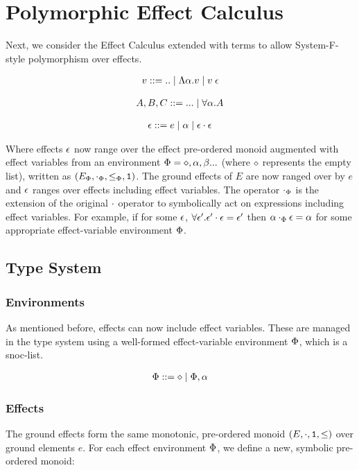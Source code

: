 \documentclass{Report}
\begin{document}
\section{Polymorphic Effect Calculus}

Next, we consider the Effect Calculus extended with terms to allow System-F-style polymorphism over effects.

\begin{align*}
    v::=\text{..}\mid\elam{\a}{v}\mid\eapp{v}{\e}
\end{align*}

\begin{align*}
    A, B, C::=\text{...}\mid \all{\a}{A}
\end{align*}

\begin{align*}
    \e ::= e \mid \a \mid \e\dot\e
\end{align*}

Where effects $\e$ now range over the effect pre-ordered monoid augmented with effect variables from an environment $\P = \nil, \a, \b ...$ (where $\nil$ represents the empty list), written as $(E_\P, \dotp, \subeffectp, \1)$. The ground effects of $E$ are now ranged over by $e$ and $\e$ ranges over effects including effect variables. The operator $\dotp$ is the extension of the original $\dot$ operator to symbolically act on expressions including effect variables. For example, if for some $\e$, $\forall \e'. \e'\dot\e = \e'$ then $\a\dotp\e = \a$ for some appropriate effect-variable environment $\P$.




\subsection{Type System}
\subsubsection{Environments}
As mentioned before, effects can now include effect variables. These are managed in the type system using a well-formed effect-variable environment $\P$, which is a snoc-list.

\begin{align*}
    \P ::= \nil \mid \P, \a
\end{align*}



\subsubsection{Effects}
The ground effects form the same monotonic, pre-ordered monoid $(E, \dot, \1, \subeffect)$ over ground elements $e$. For each effect environment $\P$, we define a new, symbolic pre-ordered monoid:
\end{document}

